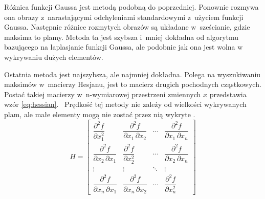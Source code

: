 Różnica funkcji Gaussa jest metodą podobną do poprzedniej.
Ponownie rozmywa ona obrazy z~narastającymi odchyleniami standardowymi z~użyciem
funkcji Gaussa.
Następnie różnice rozmytych obrazów są układane w~sześcianie, gdzie maksima to
plamy.
Metoda ta jest szybsza i~mniej dokładna od algorytmu bazującego na laplasjanie
funkcji Gaussa, ale podobnie jak ona jest wolna w wykrywaniu dużych elementów.

Ostatnia metoda jest najszybsza, ale najmniej dokładna.
Polega na wyszukiwaniu maksimów w~macierzy Hesjanu, jest to macierz drugich
pochodnych cząstkowych.
Postać takiej macierzy w~n-wymiarowej przestrzeni zmiennych $ x $ przedstawia
wzór \ref{eq:hessian}.~%
Prędkość tej metody nie zależy od wielkości wykrywanych plam, ale małe elementy
mogą nie zostać przez nią wykryte \cite{scikit_reference}.
\begin{equation}
    H = \begin{bmatrix}
        \dfrac{\partial^2 f}{\partial x_1^2} &
        \dfrac{\partial^2 f}{\partial x_1\,\partial x_2} &
        \cdots & \dfrac{\partial^2 f}{\partial x_1\,\partial x_n} \\[2.2ex]
        \dfrac{\partial^2 f}{\partial x_2\,\partial x_1} &
        \dfrac{\partial^2 f}{\partial x_2^2} &
        \cdots & \dfrac{\partial^2 f}{\partial x_2\,\partial x_n} \\[2.2ex]
        \vdots & \vdots & \ddots & \vdots \\[2.2ex]
        \dfrac{\partial^2 f}{\partial x_n\,\partial x_1} &
        \dfrac{\partial^2 f}{\partial x_n\,\partial x_2} &
        \cdots &
        \dfrac{\partial^2 f}{\partial x_n^2}
    \end{bmatrix}
    \label{eq:hessian}
\end{equation}


